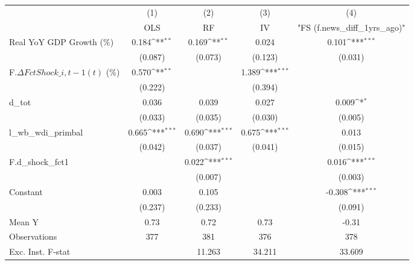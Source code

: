 {
\def\sym#1{\ifmmode^{#1}\else\(^{#1}\)\fi}
\begin{tabular}{l*{4}{c}}
\toprule
                    &\multicolumn{1}{c}{(1)}&\multicolumn{1}{c}{(2)}&\multicolumn{1}{c}{(3)}&\multicolumn{1}{c}{(4)}\\
                    &\multicolumn{1}{c}{OLS}&\multicolumn{1}{c}{RF}&\multicolumn{1}{c}{IV}&\multicolumn{1}{c}{ "FS (f.news\_diff\_1yrs\_ago)" }\\
\midrule
Real YoY GDP Growth (\%)&       0.184\sym{**} &       0.169\sym{**} &       0.024         &       0.101\sym{***}\\
                    &     (0.087)         &     (0.073)         &     (0.123)         &     (0.031)         \\
\addlinespace
F.$\Delta FctShock\_{i,t-1}(t)$ (\%)&       0.570\sym{**} &                     &       1.389\sym{***}&                     \\
                    &     (0.222)         &                     &     (0.394)         &                     \\
\addlinespace
d\_tot               &       0.036         &       0.039         &       0.027         &       0.009\sym{*}  \\
                    &     (0.033)         &     (0.035)         &     (0.030)         &     (0.005)         \\
\addlinespace
l\_wb\_wdi\_primbal    &       0.665\sym{***}&       0.690\sym{***}&       0.675\sym{***}&       0.013         \\
                    &     (0.042)         &     (0.037)         &     (0.041)         &     (0.015)         \\
\addlinespace
F.d\_shock\_fct1      &                     &       0.022\sym{***}&                     &       0.016\sym{***}\\
                    &                     &     (0.007)         &                     &     (0.003)         \\
\addlinespace
Constant            &       0.003         &       0.105         &                     &      -0.308\sym{***}\\
                    &     (0.237)         &     (0.233)         &                     &     (0.091)         \\
\midrule
Mean Y              &        0.73         &        0.72         &        0.73         &       -0.31         \\
Observations        &         377         &         381         &         376         &         378         \\
Exc. Inst. F-stat   &                     &      11.263         &      34.211         &      33.609         \\
\bottomrule
\end{tabular}
}

